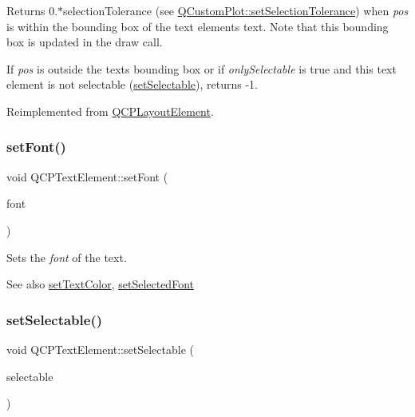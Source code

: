 Returns 0.$\ast$selection\+Tolerance (see \hyperlink{classQCustomPlot_a4dc31241d7b09680950e19e5f971ed93}{Q\+Custom\+Plot\+::set\+Selection\+Tolerance}) when {\itshape pos} is within the bounding box of the text element\textquotesingle{}s text. Note that this bounding box is updated in the draw call.

If {\itshape pos} is outside the text\textquotesingle{}s bounding box or if {\itshape only\+Selectable} is true and this text element is not selectable (\hyperlink{classQCPTextElement_a3c5f9b1897a036b16495ed3fb8371c55}{set\+Selectable}), returns -\/1.

Reimplemented from \hyperlink{classQCPLayoutElement_ae97f483cccedadbf18ea4525ef240ee4}{Q\+C\+P\+Layout\+Element}.

\mbox{\label{classQCPTextElement_a09b3241769528fa87cb4bf35c97defad}} 
\subsubsection{\texorpdfstring{set\+Font()}{setFont()}}
{\footnotesize\ttfamily void Q\+C\+P\+Text\+Element\+::set\+Font (\begin{DoxyParamCaption}\item[{const Q\+Font \&}]{font }\end{DoxyParamCaption})}

Sets the {\itshape font} of the text.

\begin{DoxySeeAlso}{See also}
\hyperlink{classQCPTextElement_a4f3b8361c3ffb3f84346954929ce93ba}{set\+Text\+Color}, \hyperlink{classQCPTextElement_a0a2397a3c4ede519e16ab3e991904065}{set\+Selected\+Font} 
\end{DoxySeeAlso}
\mbox{\label{classQCPTextElement_a3c5f9b1897a036b16495ed3fb8371c55}} 
\subsubsection{\texorpdfstring{set\+Selectable()}{setSelectable()}}
{\footnotesize\ttfamily void Q\+C\+P\+Text\+Element\+::set\+Selectable (\begin{DoxyParamCaption}\item[{bool}]{selectable }\end{DoxyParamCaption})}

